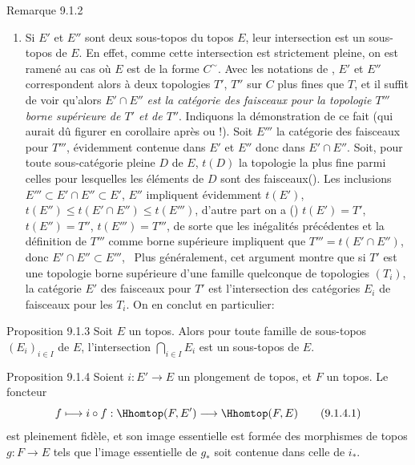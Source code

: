 \documentclass[10pt]{../fichiers-configuration-latex/smfart}
\begin{document}
\begin{enonce*}[remark]{Remarque 9.1.2}
\begin{enumerate}
\item Si $E'$ et $E''$ sont deux sous-topos du topos $E$, leur
intersection est un sous-topos de $E$. En effet, comme cette
intersection est strictement pleine, on est ramené au cas où $E$ est
de la forme $C^{\sim}$. Avec les notations de , $E'$ et $E''$
correspondent alors à deux topologies $T'$, $T''$ sur $C$ plus fines
que $T$, et il suffit de voir qu'alors $E'\cap E''$ \emph{est la
catégorie des faisceaux pour la topologie $T'''$ borne supérieure de
$T'$ et de $T''$}. Indiquons la démonstration de ce fait (qui
aurait dû figurer en corollaire après  ou
 !). Soit $E'''$ la catégorie des faisceaux pour
$T'''$, évidemment contenue dans $E'$ et $E''$ donc dans $E'\cap
E''$. Soit, pour toute sous-catégorie pleine $D$ de $E$, $t(D)$ la
topologie la plus fine parmi celles pour lesquelles les éléments de
$D$ sont des faisceaux\pageoriginale (). Les
inclusions $E'''\subset E'\cap E''\subset E'$, $E''$ impliquent
évidemment $t(E')$, $t(E'')\leq t(E'\cap E'')\leq t(E''')$, d'autre
part on a () $t(E')=T'$, $t(E'')=T''$,
$t(E''')=T'''$, de sorte que les inégalités précédentes et la
définition de $T'''$ comme borne supérieure impliquent que
$T'''=t(E'\cap E'')$, donc $E'\cap E''\subset E'''$, \cqfd\  Plus
généralement, cet argument montre que si $T'$ est une topologie
borne supérieure d'une famille quelconque de topologies $(T_i)$, la
catégorie $E'$ des faisceaux pour $T'$ est l'intersection des
catégories $E_i$ de faisceaux pour les $T_i$. On en conclut en
particulier:
\end{enumerate}
\end{enonce*}

\begin{enonce*}[remark]{Proposition 9.1.3}
Soit $E$ un topos. Alors pour toute famille de sous-topos
$(E_i)_{i\in I}$ de $E$, l'intersection $\bigcap_{i\in I} E_i$ est
un sous-topos de $E$.
\end{enonce*}

\begin{enonce*}{Proposition 9.1.4}
Soient $i:E'\rightarrow E$ un plongement de topos, et $F$ un topos.
Le foncteur
\begin{equation*}
f\longmapsto i\circ f:\Hhomtop(F,E')\longrightarrow
\Hhomtop(F,E)\tag{9.1.4.1}
\end{equation*}
est pleinement fidèle, et son image essentielle est formée des
morphismes de topos $g:F\rightarrow E$ tels que l'image essentielle
de $g_{\ast}$ soit contenue dans celle de $i_{\ast}$.
\end{enonce*}
\end{document}
